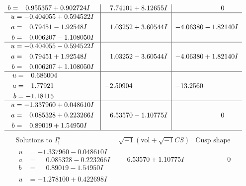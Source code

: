 \documentclass[1p]{elsarticle_modified}
\theoremstyle{definition}
\newcommand{\I}{\sqrt{-1}}
\begin{document}
$$\begin{array}{c|c|c}
\begin{aligned}
b &= \phantom{-}0.955357 + 0.902724 I\end{aligned}
 & \phantom{-}7.74101 + 8.12655 I & \phantom{-0.000000 } 0 \\ \hline\begin{aligned}
u &= -0.404055 + 0.594522 I \\
a &= \phantom{-}0.79451 - 1.92548 I \\
b &= \phantom{-}0.006207 - 1.108050 I\end{aligned}
 & \phantom{-}1.03252 + 3.60544 I & -4.06380 - 1.82140 I \\ \hline\begin{aligned}
u &= -0.404055 - 0.594522 I \\
a &= \phantom{-}0.79451 + 1.92548 I \\
b &= \phantom{-}0.006207 + 1.108050 I\end{aligned}
 & \phantom{-}1.03252 - 3.60544 I & -4.06380 + 1.82140 I \\ \hline\begin{aligned}
u &= \phantom{-}0.686004\phantom{ +0.000000I} \\
a &= \phantom{-}1.77921\phantom{ +0.000000I} \\
b &= -1.18115\phantom{ +0.000000I}\end{aligned}
 & -2.50904\phantom{ +0.000000I} & -13.2560\phantom{ +0.000000I} \\ \hline\begin{aligned}
u &= -1.337960 + 0.048610 I \\
a &= \phantom{-}0.085328 + 0.223266 I \\
b &= \phantom{-}0.89019 + 1.54950 I\end{aligned}
 & \phantom{-}6.53570 - 1.10775 I & \phantom{-0.000000 } 0\\
 \hline 
 \end{array}$$\newpage$$\begin{array}{c|c|c}  
\text{Solutions to }I^u_{1}& \I (\text{vol} + \sqrt{-1}CS) & \text{Cusp shape}\\
 \hline 
\begin{aligned}
u &= -1.337960 - 0.048610 I \\
a &= \phantom{-}0.085328 - 0.223266 I \\
b &= \phantom{-}0.89019 - 1.54950 I\end{aligned}
 & \phantom{-}6.53570 + 1.10775 I & \phantom{-0.000000 } 0 \\ \hline\begin{aligned}
u &= -1.278100 + 0.422698 I \\

\end{aligned}
\end{array}$$
\end{document}
